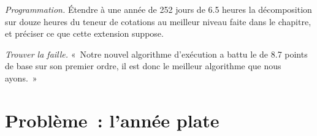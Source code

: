 \begin{exercise}[$\star\star\star$]\label{exo:rs:measuring-market-making-and-execution:7}
\emph{Programmation.} Étendre à une année de 252 jours de 6.5 heures la décomposition sur douze heures du teneur de cotations au meilleur niveau faite dans le chapitre, et préciser ce que cette extension suppose.
\end{exercise}

\begin{exercise}[$\star\star\star$]\label{exo:rs:measuring-market-making-and-execution:8}
\emph{Trouver la faille.} «~Notre nouvel algorithme d'exécution a battu le  de 8.7 points de base sur son premier ordre, il est donc le meilleur algorithme que nous ayons.~»
\end{exercise}

\section{Problème~: l'année plate}

